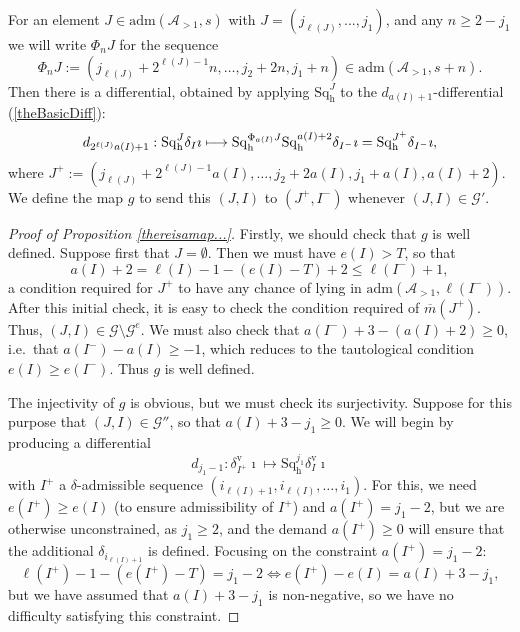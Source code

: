 \documentclass[11pt]{amsart} \renewcommand{\baselinestretch}{1.2}
\theoremstyle{plain}
\numberwithin{equation}{section} %
\theoremstyle{plain}
\numberwithin{equation}{chapter} %
\newcommand{\calA}{\mathcal{A}}
\newcommand{\calg}{\mathcal{G}}
\newcommand{\minDimP}{\overline{m}}
\newcommand{\LieSteen}{\calA}
\newcommand{\aS}[1]{\mathrm{adm}(\LieSteen_{>1},#1)}
\newcommand{\uver}{^\mathrm{v}}
\newcommand{\dhor}{_\mathrm{h}}
\newcommand{\Sqh}{\mathrm{Sq}\dhor}
\newcommand{\deltav}{\delta\uver}
\renewcommand{\mapsto}{\longmapsto}
\begin{document}
\begin{The Bousfield-Kan spectral sequence for a sphere}
For an element $J\in \aS{s}$ with $J=(j_{\ell(J)},\ldots,j_1)$, and any $n\geq 2-j_1$ we will write $\Phi_nJ$ for the sequence
\[\Phi_nJ:=(j_{\ell(J)}+2^{\ell(J)-1}n,\ldots,j_2+2n,j_1+n)\in \aS{s+n}.\]
Then there is a differential, obtained by applying $\Sqh^J$ to the $d_{a(I)+1}$-differential (\ref{theBasicDiff}):
\[d_{2^{\ell (J)}a(I)+1}:\Sqh^J\delta_I\imath \mapsto  \Sqh^{\Phi_{\smash{a(I)}}J}\Sqh^{a(I)+2}\delta_{I^{-}}\imath= \Sqh^{J^{+}}\delta_{I^{-}}\imath ,\]
where $J^+:= (j_{\ell(J)}+2^{\ell(J)-1}a(I),\ldots,j_2+2a(I),j_1+a(I),a(I)+2)$.
We define the map $g$ to send this $(J,I)$ to $(J^{+},I^-)$ whenever $(J,I)\in\calg'$.
\begin{proof}[Proof of Proposition \ref{thereisamap...}]
Firstly, we should check that $g$ is well defined. Suppose first that $J=\emptyset$. Then we must have $e(I)>T $, so that 
\[a(I)+2=\ell(I)-1-(e(I)-T)+2\leq \ell(I^-)+1,\]
a condition required for $J^+$ to have any chance of lying in $\aS{\ell (I^-)}$. After this initial check, it is easy to check the condition required of $\minDimP(J^{+})$. Thus, $(J,I)\in \calg\setminus \calg^e$. We must also check that $a(I^-)+3-(a(I)+2)\geq0$, i.e.\ that $a(I^-)-a(I)\geq -1$, which reduces to the tautological condition $e(I)\geq e(I^{-})$. Thus $g$ is well defined.

The injectivity of $g$ is obvious, but we must check its surjectivity. Suppose for this purpose that $(J,I)\in\calg''$, so that $a(I)+3-j_1\geq 0$. We will begin by producing a differential
\[d_{j_1-1}:\deltav_{I^+}\imath\mapsto \Sqh^{j_1}\deltav_I\imath\]
with $I^{+}$ a $\delta$-admissible sequence $(i_{\ell(I)+1},i_{\ell(I)},\ldots,i_1)$. For this, we need $e(I^{+})\geq e(I)$ (to ensure admissibility of $I^+$) and $a(I^{+})=j_1-2$, but we are otherwise unconstrained, as $j_1\geq2$, and the demand $a(I^{+})\geq0$ will ensure that the additional $\delta_{i_{\ell(I)+1}}$ is defined. Focusing on the constraint $a(I^{+})=j_1-2$:
\[\ell(I^{+})-1-(e(I^{+})-T)=j_1-2 \iff e(I^{+})-e(I)=a(I)+3-j_1,\]
but we have assumed that $a(I)+3-j_1$ is non-negative, so we have no difficulty satisfying this constraint.


\end{proof}
\end{The Bousfield-Kan spectral sequence for a sphere}
\end{document}
